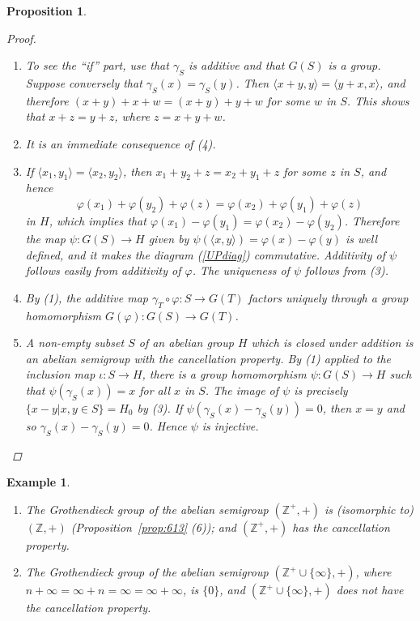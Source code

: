 \documentclass{book}
\newtheorem{example}[definition]{Example}
\newtheorem{proposition}[definition]{Proposition}
\begin{document}
\begin{proposition}
\begin{proof}
\begin{enumerate}[label=\arabic*.]
      \[
      \langle x,y\rangle=\langle x+y,y\rangle-\langle x+y,x\rangle=\gamma_S(x)-\gamma_S(y).
      \]
      \item[4.] To see the ``if'' part, use that \(\gamma_S\) is additive and that \(G(S)\) is a group.
      Suppose conversely that \(\gamma_S(x)=\gamma_S(y)\). Then \(\langle x+y,y\rangle =\langle y+x,x\rangle\),
      and therefore \((x+y)+x+w=(x+y)+y+w\) for some \(w\) in \(S\). This shows that \(x+z=y+z\), where \(z=x+y+w\).
      \item[5.] It is an immediate consequence of (4).
      \item[1.] If \(\langle x_1,y_1\rangle=\langle x_2,y_2\rangle\), then \(x_1+y_2+z=x_2+y_1+z\) for some \(z\) in \(S\), and hence
      \[
        \varphi(x_1)+\varphi(y_2)+\varphi(z)=\varphi(x_2)+\varphi(y_1)+\varphi(z)
      \]
      in \(H\), which implies that \(\varphi(x_1)-\varphi(y_1)=\varphi(x_2)-\varphi(y_2)\). Therefore the map
      \(\psi:G(S)\rightarrow H\) given by \(\psi(\langle x,y\rangle)=\varphi(x)-\varphi(y)\) is well defined,
      and it makes the diagram (\ref{UPdiag}) commutative. Additivity of \(\psi\) follows easily from additivity of \(\varphi\).
      The uniqueness of \(\psi\) follows from (3).
      \item[2.] By (1), the additive map \(\gamma_T\circ\varphi:S\rightarrow G(T)\) factors uniquely through a group homomorphism
      \(G(\varphi):G(S)\rightarrow G(T)\).
      \item[6.] A non-empty subset \(S\) of an abelian group \(H\) which is closed under addition is an abelian semigroup with the cancellation property.
      By (1) applied to the inclusion map \(\iota:S\rightarrow H\), there is a group homomorphism \(\psi:G(S)\rightarrow H\) such that \(\psi(\gamma_S(x))=x\) for all \(x\) in \(S\).
      The image of \(\psi\) is precisely \(\{x-y| x,y\in S\}=H_0\) by (3). If \(\psi(\gamma_S(x)-\gamma_S(y))=0\),
      then \(x=y\) and so \(\gamma_S(x)-\gamma_S(y)=0\). Hence \(\psi\) is injective.
    \end{enumerate}
  \end{proof}
\end{proposition}
\begin{example}
  \begin{enumerate}
    \item The Grothendieck group of the abelian semigroup \((\mathbb{Z}^+,+)\) is (isomorphic to)
    \((\mathbb{Z},+)\) (Proposition~\ref{prop:613} (6)); and \((\mathbb{Z}^+,+)\) has the cancellation property.
    \item The Grothendieck group of the abelian semigroup \((\mathbb{Z}^+\cup \{\infty\},+)\), where
    \(n+\infty=\infty+n=\infty=\infty+\infty\), is \(\{0\}\), and \((\mathbb{Z}^+\cup \{\infty\},+)\) does not have the cancellation property.
  \end{enumerate}
\end{example}
\end{document}

